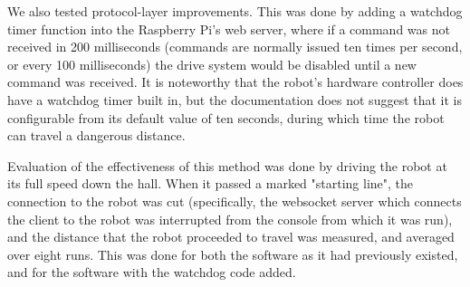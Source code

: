 \documentclass[letterpaper, 11pt]{article}
\begin{document}
\begin{multicols}{2}
We also tested protocol-layer improvements. This was done by adding a
watchdog timer function\cite{watchdog} into the Raspberry Pi's web server,
where if a command was not received in 200 milliseconds (commands are
normally issued ten times per second, or every 100 milliseconds) the drive
system would be disabled until a new command was received. It is noteworthy
that the robot's hardware controller does have a watchdog timer built in, but
the documentation does not suggest that it is configurable from its default
value of ten seconds, during which time the robot can travel a dangerous
distance.

Evaluation of the effectiveness of this method was done by driving the robot
at its full speed down the hall. When it passed a marked "starting line",
the connection to the robot was cut (specifically, the websocket server which
connects the client to the robot was interrupted from the console from which
it was run), and the distance that the robot proceeded to travel was measured, 
and averaged over eight runs. This was done for both the software as it had
previously existed, and for the software with the watchdog code added.
\end{multicols}
\end{document}
